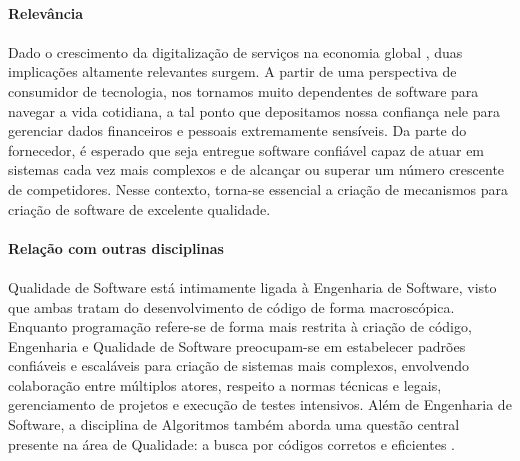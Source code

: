 \documentclass[a4paper, 16pt]{article}
\begin{document}
\newpage

\paragraph{Relevância}

\paragraph{}
Dado o crescimento da digitalização de serviços na economia global \cite{digital}, duas implicações altamente relevantes surgem. A partir de uma perspectiva de consumidor de tecnologia, nos tornamos muito dependentes de software para navegar a vida cotidiana, a tal ponto que depositamos nossa confiança nele para gerenciar dados financeiros e pessoais extremamente sensíveis. Da parte do fornecedor, é esperado que seja entregue software confiável capaz de atuar em sistemas cada vez mais complexos e de alcançar ou superar um número crescente de competidores. Nesse contexto, torna-se essencial a criação de mecanismos para criação de software de excelente qualidade.

\paragraph{Relação com outras disciplinas}

\paragraph{}
Qualidade de Software está intimamente ligada à Engenharia de Software, visto que ambas tratam do desenvolvimento de código de forma macroscópica. Enquanto programação refere-se de forma mais restrita à criação de código, Engenharia e Qualidade de Software preocupam-se em estabelecer padrões confiáveis e escaláveis para criação de sistemas mais complexos, envolvendo colaboração entre múltiplos atores, respeito a normas técnicas e legais, gerenciamento de projetos e execução de testes intensivos.
Além de Engenharia de Software, a disciplina de Algoritmos também aborda uma questão central presente na área de Qualidade: a busca por códigos corretos e eficientes \cite{algoritmo}.


\pagebreak

\printbibliography
\end{document}
